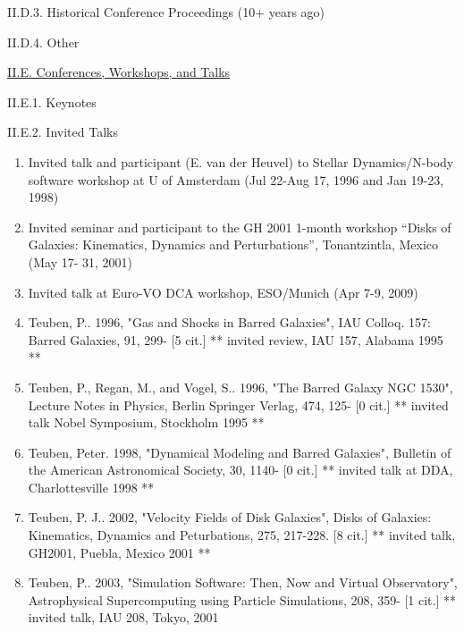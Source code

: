 \documentclass[11pt,letterpaper]{article}
\begin{document}
II.D.3. Historical Conference Proceedings (10+ years ago)

II.D.4. Other





\underline{II.E. Conferences, Workshops, and Talks}

II.E.1. Keynotes

II.E.2. Invited Talks


\begin{enumerate}[resume,label=\textbf{\arabic*}.]  
\item
Invited talk and participant (E. van der Heuvel) to Stellar
Dynamics/N-body software workshop at U of Amsterdam (Jul 22-Aug 17,
1996 and Jan 19-23, 1998)

\item
Invited seminar and participant to the GH 2001 1-month workshop
``Disks of Galaxies:  Kinematics, Dynamics and Perturbations'',
Tonantzintla, Mexico (May 17-			31, 2001)

\item
Invited talk at Euro-VO DCA workshop, ESO/Munich (Apr 7-9, 2009)  

\item
Teuben, P..  1996,  "Gas and Shocks in Barred Galaxies",
IAU Colloq. 157: Barred Galaxies,  91,  299- [5 cit.]
** invited review, IAU 157, Alabama 1995 **

\item
Teuben, P., Regan, M., and Vogel, S..  1996,
"The Barred Galaxy NGC 1530", Lecture Notes in Physics, Berlin Springer Verlag,  474,  125- [0 cit.]
** invited talk Nobel Symposium, Stockholm 1995 **

\item
Teuben, Peter.  1998,  "Dynamical Modeling and Barred Galaxies",
Bulletin of the American Astronomical Society,  30,  1140- [0 cit.]
** invited talk at DDA, Charlottesville 1998 **

\item
Teuben, P. J..  2002,
"Velocity Fields of Disk Galaxies", Disks of Galaxies: Kinematics, Dynamics and Peturbations,  275,  217-228.  [8 cit.]
** invited talk, GH2001, Puebla, Mexico 2001 **

\item
Teuben, P..  2003,
"Simulation Software: Then, Now and Virtual Observatory",
Astrophysical Supercomputing using Particle Simulations,  208,  359- [1 cit.]
** invited talk, IAU 208, Tokyo, 2001
\end{enumerate}
\end{document}
